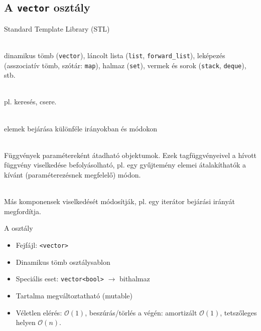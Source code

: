 \subsection{A \texttt{vector} osztály}

\begin{frame}
    Standard Template Library (STL)
    \small
    \begin{description}[m]
        \item[Gyűjtemények (containers)] \hfill \\ dinamikus tömb (\texttt{vector}), láncolt lista (\texttt{list}, \texttt{forward\_list}), leképezés (asszociatív tömb, szótár: \texttt{map}), halmaz (\texttt{set}), vermek és sorok (\texttt{stack}, \texttt{deque}), stb.
        \item[Algoritmusok] \hfill \\ pl. keresés, csere. 
        \item[Iterátorok] \hfill \\ elemek bejárása különféle irányokban és módokon
        \item[\emph{Függvény objektumok} (functors)] \hfill \\ Függvények paramétereként átadható objektumok. Ezek tagfüggvényeivel a hívott függvény viselkedése befolyásolható, pl. egy gyűjtemény elemei átalakíthatók a kívánt (paraméterezésnek megfelelő) módon.
        \item[\emph{Adapterek} (adapters)] \hfill \\ Más komponensek viselkedését módosítják, pl. egy iterátor bejárási irányát megfordítja. 
    \end{description}
\end{frame}

\begin{frame}
    A  osztály
    \begin{itemize}
        \item Fejfájl: \texttt{<vector>}
        \item Dinamikus tömb osztálysablon
        \item Speciális eset: \texttt{vector<bool>} $\to$ bithalmaz
        \item Tartalma megváltoztatható (mutable)
        \item Véletlen elérés: $\mathcal{O}(1)$, beszúrás/törlés a végén: amortizált $\mathcal{O}(1)$, tetszőleges helyen $\mathcal{O}(n)$.
    \end{itemize}
\end{frame}

